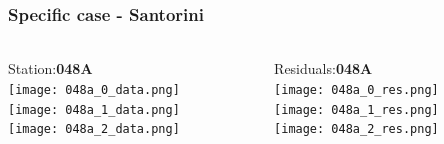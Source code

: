\begin{frame}
  \frametitle{Specific case - Santorini}
  \framesubtitle{}
  \label{}
  \vskip-1cm
  \begin{columns}[T]
    \begin{column}{.33\textwidth}
      \begin{center}
      Station:\textbf{048A}\\
         \texttt{[image: 048a\_0\_data.png]}\\
         \texttt{[image: 048a\_1\_data.png]}\\
         \texttt{[image: 048a\_2\_data.png]}
       \end{center} 
    \end{column}
    \begin{column}{.33\textwidth}
      \begin{center}
      Residuals:\textbf{048A}\\
         \texttt{[image: 048a\_0\_res.png]}\\
         \texttt{[image: 048a\_1\_res.png]}\\
         \texttt{[image: 048a\_2\_res.png]}
       \end{center} 
      
    \end{column}
  \end{columns}
\end{frame}
\note{}


